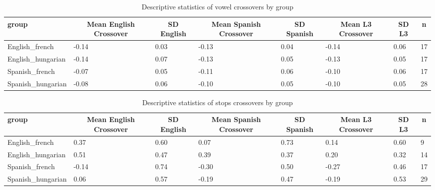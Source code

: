 \documentclass[
  english,
  man]{apa6}
\begin{document}
\begin{table}[tbp]

\begin{center}
\begin{threeparttable}

\caption{\label{tab:unnamed-chunk-3}Descriptive statistics of vowel crossovers by group}

\begin{tabular}{llllllll}
\toprule
group & \multicolumn{1}{c}{Mean English Crossover} & \multicolumn{1}{c}{SD English} & \multicolumn{1}{c}{Mean Spanish Crossover} & \multicolumn{1}{c}{SD Spanish} & \multicolumn{1}{c}{Mean L3 Crossover} & \multicolumn{1}{c}{SD L3} & \multicolumn{1}{c}{n}\\
\midrule
English\_french & -0.14 & 0.03 & -0.13 & 0.04 & -0.14 & 0.06 & 17\\
English\_hungarian & -0.14 & 0.07 & -0.13 & 0.05 & -0.13 & 0.05 & 17\\
Spanish\_french & -0.07 & 0.05 & -0.11 & 0.06 & -0.10 & 0.06 & 17\\
Spanish\_hungarian & -0.08 & 0.06 & -0.10 & 0.05 & -0.10 & 0.05 & 28\\
\bottomrule
\end{tabular}

\end{threeparttable}
\end{center}

\end{table}

\begin{table}[tbp]

\begin{center}
\begin{threeparttable}

\caption{\label{tab:unnamed-chunk-4}Descriptive statistics of stops crossovers by group}

\begin{tabular}{llllllll}
\toprule
group & \multicolumn{1}{c}{Mean English Crossover} & \multicolumn{1}{c}{SD English} & \multicolumn{1}{c}{Mean Spanish Crossover} & \multicolumn{1}{c}{SD Spanish} & \multicolumn{1}{c}{Mean L3 Crossover} & \multicolumn{1}{c}{SD L3} & \multicolumn{1}{c}{n}\\
\midrule
English\_french & 0.37 & 0.60 & 0.07 & 0.73 & 0.14 & 0.60 & 9\\
English\_hungarian & 0.51 & 0.47 & 0.39 & 0.37 & 0.20 & 0.32 & 14\\
Spanish\_french & -0.14 & 0.74 & -0.30 & 0.50 & -0.27 & 0.46 & 17\\
Spanish\_hungarian & 0.06 & 0.57 & -0.19 & 0.47 & -0.19 & 0.53 & 29\\
\bottomrule
\end{tabular}

\end{threeparttable}
\end{center}

\end{table}
\end{document}
